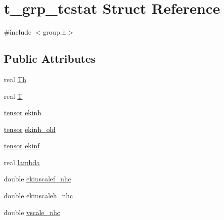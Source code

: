 \hypertarget{structt__grp__tcstat}{\section{t\-\_\-grp\-\_\-tcstat \-Struct \-Reference}
\label{structt__grp__tcstat}
}


{\ttfamily \#include $<$group.\-h$>$}

\subsection*{\-Public \-Attributes}
\begin{DoxyCompactItemize}
\item 
real \hyperlink{structt__grp__tcstat_ae9abd095cfdcce942aaac949a01ea152}{\-Th}
\item 
real \hyperlink{structt__grp__tcstat_a12387599d089d6c24ad9ebfe5b7d6f9e}{\-T}
\item 
\hyperlink{share_2template_2gromacs_2types_2simple_8h_aef0bf341f56ce75f09dbb64350488a61}{tensor} \hyperlink{structt__grp__tcstat_a025ddab3102db833083aca82dd9ae0b4}{ekinh}
\item 
\hyperlink{share_2template_2gromacs_2types_2simple_8h_aef0bf341f56ce75f09dbb64350488a61}{tensor} \hyperlink{structt__grp__tcstat_aaea0095395ff1ecac11681d943ceabbb}{ekinh\-\_\-old}
\item 
\hyperlink{share_2template_2gromacs_2types_2simple_8h_aef0bf341f56ce75f09dbb64350488a61}{tensor} \hyperlink{structt__grp__tcstat_a7ca8fdafbd42ba4fcc90d73389eb441b}{ekinf}
\item 
real \hyperlink{structt__grp__tcstat_a8b187e1463143346a66cd19a1b99b221}{lambda}
\item 
double \hyperlink{structt__grp__tcstat_a88ea2d30e2cd9857bcc8ee97ae8c7f68}{ekinscalef\-\_\-nhc}
\item 
double \hyperlink{structt__grp__tcstat_a83f732b149e7549580fadb476754deee}{ekinscaleh\-\_\-nhc}
\item 
double \hyperlink{structt__grp__tcstat_a66e5614e6198be6a92812b04bc0c3c96}{vscale\-\_\-nhc}
\end{DoxyCompactItemize}


